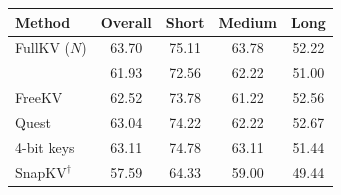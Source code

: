 \begin{tabular}{l|cccc}
\toprule
\textbf{Method} & Overall & Short & Medium & Long \\
\midrule
FullKV ($N$) & 63.70 & 75.11 & 63.78 & 52.22 \\
\midrule
\method{} & 61.93 & 72.56 & 62.22 & 51.00 \\
FreeKV & 62.52 & 73.78 & 61.22 & 52.56 \\
Quest & 63.04 & 74.22 & 62.22 & 52.67 \\
4-bit keys & 63.11 & 74.78 & 63.11 & 51.44 \\
SnapKV$^\dagger$ & 57.59 & 64.33 & 59.00 & 49.44 \\
\bottomrule
\end{tabular}
